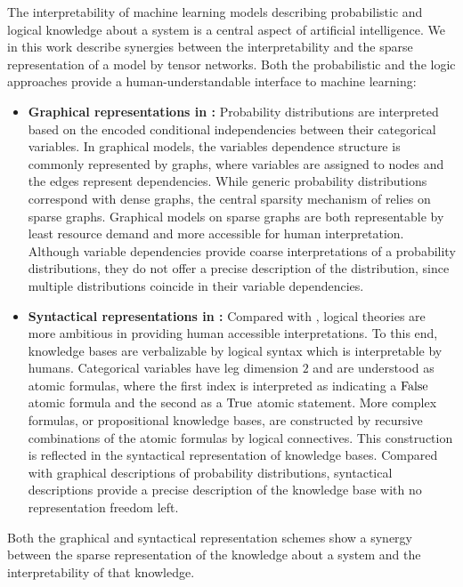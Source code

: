 The interpretability of machine learning models describing probabilistic and logical knowledge about a system is a central aspect of artificial intelligence.
We in this work describe synergies between the interpretability and the sparse representation of a model by tensor networks.
Both the probabilistic and the logic approaches provide a human-understandable interface to machine learning:
\begin{itemize} %
    \item \textbf{Graphical representations in \probabilityTheory{}:} Probability distributions are interpreted based on the encoded conditional independencies between their categorical variables.
    In graphical models, the variables dependence structure is commonly represented by graphs, where variables are assigned to nodes and the edges represent dependencies.
    While generic probability distributions correspond with dense graphs, the central sparsity mechanism of \probabilityTheory{} relies on sparse graphs.
    Graphical models on sparse graphs are both representable by least resource demand and more accessible for human interpretation.
    Although variable dependencies provide coarse interpretations of a probability distributions, they do not offer a precise description of the distribution, since multiple distributions coincide in their variable dependencies.
    \item \textbf{Syntactical representations in \propositionalLogic{}:} Compared with \probabilityTheory{}, logical theories are more ambitious in providing human accessible interpretations.
    To this end, knowledge bases are verbalizable by logical syntax which is interpretable by humans.
    Categorical variables have leg dimension $2$ and are understood as atomic formulas, where the first index is interpreted as indicating a $\mathrm{False}$ atomic formula and the second as a $\mathrm{True}$ atomic statement.
    More complex formulas, or propositional knowledge bases, are constructed by recursive combinations of the atomic formulas by logical connectives.
    This construction is reflected in the syntactical representation of knowledge bases.
    Compared with graphical descriptions of probability distributions, syntactical descriptions provide a precise description of the knowledge base with no representation freedom left.
\end{itemize}
Both the graphical and syntactical representation schemes show a synergy between the sparse representation of the knowledge about a system and the interpretability of that knowledge.
